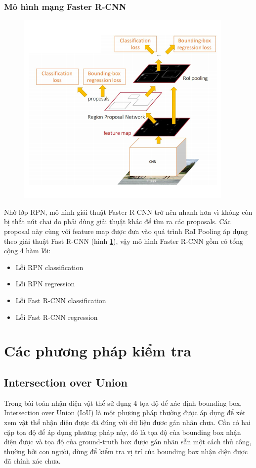 \subsubsection{Mô hình mạng Faster R-CNN}
\begin{center}
    \begin{figure}[H]
    \centering
    \includegraphics[width=0.7\columnwidth]{images/chap2/Faster_Rcnn_3.png}
    \label{chap2:faster_rcnn}
    \end{figure}
\end{center}
Nhờ lớp RPN, mô hình giải thuật Faster R-CNN trở nên nhanh hơn vì không còn bị thắt nút chai do phải dùng giải thụật khác để tìm ra các proposals. Các proposal này cùng với feature map được đưa vào quá trình RoI Pooling áp dụng theo giải thuật Fast R-CNN (hình \ref{chap2:faster_rcnn}), vậy mô hình Faster R-CNN gồm có tổng cộng 4 hàm lỗi:
\begin{itemize}
	\item Lỗi RPN classification
	\item Lỗi RPN regression
	\item Lỗi Fast R-CNN classification
	\item Lỗi Fast R-CNN regression
\end{itemize}
\section{Các phương pháp kiểm tra}
\subsection{Intersection over Union}
Trong bài toán nhận diện vật thể sử dụng 4 tọa độ để xác định bounding box, Intersection over Union (IoU) là một phương pháp thường được áp dụng để xét xem vật thể nhận diện được đã đúng với dữ liệu đươc gán nhãn chưa. Cần có hai cặp tọa độ để áp dụng phương pháp này, đó là tọa độ của bounding box nhận diện được và tọa độ của ground-truth box được gán nhãn sẵn một cách thủ công, thường bởi con người, dùng để kiểm tra vị trí của bounding box nhận diện được đã chính xác chưa.

